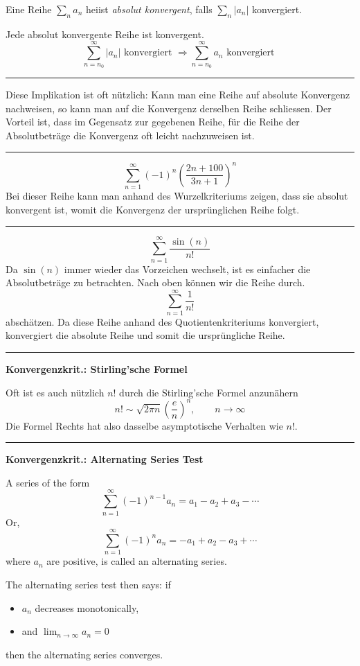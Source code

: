 \documentclass[a4paper,landscape,8pt]{extarticle}
\newcommand{\abs}[1]{\left\lvert #1 \right\rvert}
\newcommand{\sep}{\vspace{5pt}\noindent\hrule\vspace{5pt}}
\begin{document}
\begin{multicols*}{4}
\Def Eine Reihe $\sum_{n} a_n$ heiist \emph{absolut konvergent}, falls
$\sum_{n} \abs{a_n}$ konvergiert.

 Jede absolut konvergente Reihe ist konvergent.
\[
\sum_{n=n_0}^{\infty} \abs{a_n} \text{ konvergiert }
\Longrightarrow
\sum_{n=n_0}^{\infty} a_n \text{ konvergiert }
\]

\begin{warmup}
\sep

\Vorgehen Diese Implikation ist oft nützlich: Kann man eine Reihe auf absolute
Konvergenz nachweisen, so kann man auf die Konvergenz derselben Reihe
schliessen. Der Vorteil ist, dass im Gegensatz zur gegebenen Reihe, für die
Reihe der Absolutbeträge die Konvergenz oft leicht nachzuweisen ist.

\sep

\Bsp
\[
\sum_{n=1}^{\infty} (-1)^n \left(\frac{2n + 100}{3n+1}\right)^n
\]
Bei dieser Reihe kann man anhand des Wurzelkriteriums zeigen, dass sie absolut
konvergent ist, womit die Konvergenz der ursprünglichen Reihe folgt.

\sep

\Bsp
\[
\sum_{n=1}^{\infty} \frac{\sin(n)}{n!}
\]
Da $\sin(n)$ immer wieder das Vorzeichen wechselt, ist es einfacher die
Absolutbeträge zu betrachten. Nach oben können wir die Reihe durch.
\[
\sum_{n=1}^{\infty} \frac{1}{n!}
\]
abschätzen. Da diese Reihe anhand des Quotientenkriteriums konvergiert,
konvergiert die absolute Reihe und somit die ursprüngliche Reihe.
\end{warmup}

\sep

\textbf{Konvergenzkrit.: Stirling'sche Formel}

Oft ist es auch nützlich $n!$ durch die Stirling'sche Formel anzunähern
\[
n! \sim \sqrt{2\pi n} \left(\frac{e}{n}\right)^n, \qquad n\to \infty
\]
Die Formel Rechts hat also dasselbe asymptotische Verhalten wie $n!$.

\sep

\textbf{Konvergenzkrit.: Alternating Series Test}

A series of the form
\[
\sum_{n=1}^\infty (-1)^{n-1} a_n = a_1 - a_2 + a_3 - \cdots \!
\]
Or,
\[
 \sum_{n=1}^\infty (-1)^{n} a_n = - a_1 + a_2 - a_3 + \cdots \!
\]
where $a_n$ are positive, is called an alternating series.

The alternating series test then says: if 
\begin{itemize}
  \item $a_n$ decreases monotonically,
  \item and $\lim_{n \to \infty} a_n = 0$
\end{itemize}
then the alternating series converges.


\end{multicols*}
\end{document}
